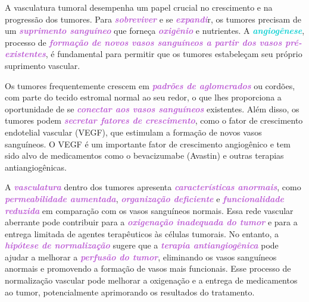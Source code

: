 \documentclass[11pt,a4paper]{article}
\begin{document}
	A vasculatura tumoral desempenha um papel crucial no crescimento e na progressão dos tumores. Para \textcolor{MediumOrchid}{\textbf{\textit{sobreviver}}} e se \textcolor{MediumOrchid}{\textbf{\textit{expandi}}}r, os tumores precisam de um \textcolor{MediumOrchid}{\textbf{\textit{suprimento sanguíneo}}} que forneça \textcolor{MediumOrchid}{\textbf{\textit{oxigênio}}} e nutrientes. A \textcolor{DarkTurquoise}{\textbf{\textit{angiogênese}}}, processo de \textcolor{MediumOrchid}{\textbf{\textit{formação de novos vasos sanguíneos a partir dos vasos pré-existentes}}}, é fundamental para permitir que os tumores estabeleçam seu próprio suprimento vascular.

	Os tumores frequentemente crescem em \textcolor{MediumOrchid}{\textbf{\textit{padrões de aglomerados}}} ou cordões, com parte do tecido estromal normal ao seu redor, o que lhes proporciona a oportunidade de se \textcolor{MediumOrchid}{\textbf{\textit{conectar aos vasos sanguíneos}}} existentes. Além disso, os tumores podem \textcolor{MediumOrchid}{\textbf{\textit{secretar fatores de crescimento}}}, como o fator de crescimento endotelial vascular (VEGF), que estimulam a formação de novos vasos sanguíneos. O VEGF é um importante fator de crescimento angiogênico e tem sido alvo de medicamentos como o bevacizumabe (Avastin) e outras terapias antiangiogênicas.

	A \textcolor{MediumOrchid}{\textbf{\textit{vasculatura}}} dentro dos tumores apresenta \textcolor{MediumOrchid}{\textbf{\textit{características anormais}}}, como \textcolor{MediumOrchid}{\textbf{\textit{permeabilidade aumentada}}}, \textcolor{MediumOrchid}{\textbf{\textit{organização deficiente}}} e \textcolor{MediumOrchid}{\textbf{\textit{funcionalidade reduzida}}} em comparação com os vasos sanguíneos normais. Essa rede vascular aberrante pode contribuir para a \textcolor{MediumOrchid}{\textbf{\textit{oxigenação inadequada do tumor}}} e para a entrega limitada de agentes terapêuticos às células tumorais. No entanto, a \textcolor{MediumOrchid}{\textbf{\textit{hipótese de normalização}}} sugere que a \textcolor{MediumOrchid}{\textbf{\textit{terapia antiangiogênica}}} pode ajudar a melhorar a \textcolor{MediumOrchid}{\textbf{\textit{perfusão do tumor}}}, eliminando os vasos sanguíneos anormais e promovendo a formação de vasos mais funcionais. Esse processo de normalização vascular pode melhorar a oxigenação e a entrega de medicamentos ao tumor, potencialmente aprimorando os resultados do tratamento.
\end{document}
